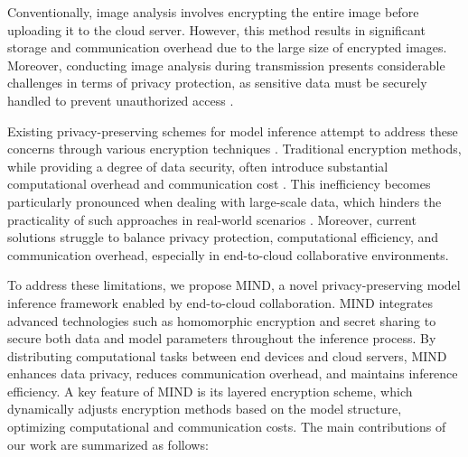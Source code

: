 \documentclass[conference]{IEEEtran}
\begin{document}
Conventionally, image analysis involves encrypting the entire image before uploading it to the cloud server. However, this method results in significant storage and communication overhead due to the large size of encrypted images. Moreover, conducting image analysis during transmission presents considerable challenges in terms of privacy protection, as sensitive data must be securely handled to prevent unauthorized access \cite{cui2018security}\cite{van2014datafication}.

Existing privacy-preserving schemes for model inference attempt to address these concerns through various encryption techniques \cite{fu2020vfl}\cite{yang2012efficient}. Traditional encryption methods, while providing a degree of data security, often introduce substantial computational overhead and communication cost \cite{kerschbaum2012outsourced}. This inefficiency becomes particularly pronounced when dealing with large-scale data, which hinders the practicality of such approaches in real-world scenarios \cite{li2015encdb}. Moreover, current solutions struggle to balance privacy protection, computational efficiency, and communication overhead, especially in end-to-cloud collaborative environments.

To address these limitations, we propose MIND, a novel privacy-preserving model inference framework enabled by end-to-cloud collaboration. MIND integrates advanced technologies such as homomorphic encryption and secret sharing to secure both data and model parameters throughout the inference process. By distributing computational tasks between end devices and cloud servers, MIND enhances data privacy, reduces communication overhead, and maintains inference efficiency. A key feature of MIND is its layered encryption scheme, which dynamically adjusts encryption methods based on the model structure, optimizing computational and communication costs. The main contributions of our work are summarized as follows:
\end{document}

